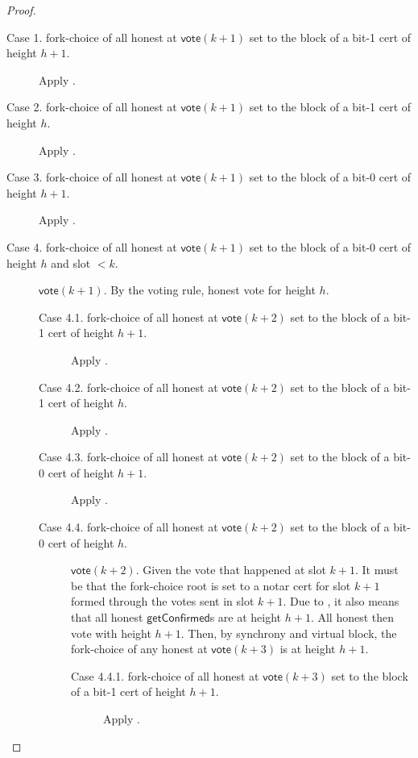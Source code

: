 \documentclass{article}
\newcommand{\vote}{\mathsf{vote}}
\newcommand{\getConfirmed}{\textsf{getConfirmed}\xspace}
\theoremstyle{plain}
\theoremstyle{definition}
\theoremstyle{remark}
\begin{document}
\begin{proof}
{ 
\begin{description}
  \item[Case 1. fork-choice of all honest at $\vote(k+1)$ set to the block of a bit-1 cert of height $h+1$.] 
  Apply .

  \item[Case 2. fork-choice of all honest at $\vote(k+1)$ set to the block of a bit-1 cert of height $h$.] 
  Apply .


  \item[Case 3. fork-choice of all honest at $\vote(k+1)$ set to the block of a bit-0 cert of height $h+1$.] 
  Apply .

  \item[Case 4. fork-choice of all honest at $\vote(k+1)$ set to the block of a bit-0 cert of height $h$ and slot $<k$.]
  $\vote(k+1)$. By the voting rule, honest vote for height $h$.

  \begin{description}
    \item[Case 4.1. fork-choice of all honest at $\vote(k+2)$ set to the block of a bit-1 cert of height $h+1$.] 
    Apply .

    \item[Case 4.2. fork-choice of all honest at $\vote(k+2)$ set to the block of a bit-1 cert of height $h$.] 
    Apply .


    \item[Case 4.3. fork-choice of all honest at $\vote(k+2)$ set to the block of a bit-0 cert of height $h+1$.] 
    Apply .

    \item[Case 4.4. fork-choice of all honest at $\vote(k+2)$ set to the block of a bit-0 cert of height $h$.]
    $\vote(k+2)$.
    Given the vote that happened at slot $k+1$. It must be that the fork-choice root is set to a notar cert for slot $k+1$ formed through the votes sent in slot $k+1$.
    Due to , it also means that all honest $\getConfirmed$s are at height $h+1$.
    All honest then vote with height $h+1$.
    Then, by synchrony and virtual block, the fork-choice of any honest at $\vote(k+3)$ is at height $h+1$.


    \begin{description}
      \item[Case 4.4.1. fork-choice of all honest at $\vote(k+3)$ set to the block of a bit-1 cert of height $h+1$.] 
      Apply .



\end{description}
\end{description}
\end{description}}
\end{proof}
\end{document}
